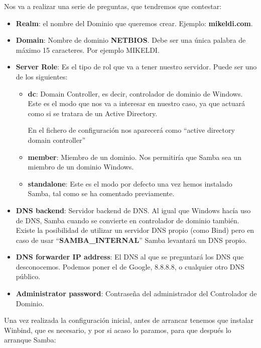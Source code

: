 \documentclass{../../../yukibook.cls/yukibook}
\begin{document}
Nos va a realizar una serie de preguntas, que tendremos que contestar:
\begin{itemize}
    \item \textbf{Realm}: el nombre del Dominio que queremos crear. Ejemplo: \textbf{mikeldi.com}.

    \item \textbf{Domain}: Nombre de dominio \textbf{NETBIOS}. Debe ser una única palabra de máximo 15 caracteres. Por ejemplo MIKELDI.

    \item \textbf{Server Role}: Es el tipo de rol que va a tener nuestro servidor. Puede ser uno de los siguientes:

    \begin{itemize}
        \item \textbf{dc}: Domain Controller, es decir, controlador de dominio de Windows. Este es el modo que nos va a interesar en nuestro caso, ya que actuará como si se tratara de un Active Directory.

        En el fichero de configuración nos aparecerá como “active directory domain controller”

        \item \textbf{member}: Miembro de un dominio. Nos permitiría que Samba sea un miembro de un dominio Windows.

        \item \textbf{standalone}: Este es el modo por defecto una vez hemos instalado Samba, tal como se ha comentado previamente.
    \end{itemize}

    \item \textbf{DNS backend}: Servidor backend de DNS. Al igual que Windows hacía uso de DNS, Samba cuando se convierte en controlador de dominio también. Existe la posibilidad de utilizar un servidor DNS propio (como Bind) pero en caso de usar “\textbf{SAMBA\_INTERNAL}” Samba levantará un DNS propio.

    \item \textbf{DNS forwarder IP address}: El DNS al que se preguntará los DNS que desconocemos. Podemos poner el de Google, 8.8.8.8, o cualquier otro DNS público.

    \item \textbf{Administrator password}:  Contraseña del administrador del Controlador de Dominio.
\end{itemize}

Una vez realizada la configuración inicial, antes de arrancar tenemos que instalar Winbind, que es necesario, y por si acaso lo paramos, para que después lo arranque Samba:
\end{document}
